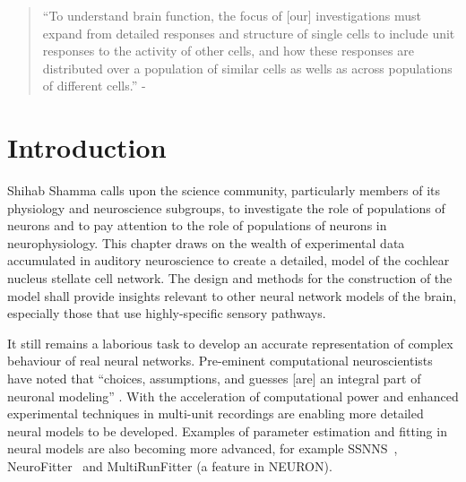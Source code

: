
\begin{quotation}
  ``To understand brain function, the focus of [our] investigations must expand from detailed responses and structure of single cells to include unit responses to the activity of other cells, and how these responses are distributed over a population of similar cells as wells as across populations  of different cells.''
- \textit{\citet[p.]{Shamma:1998}}
\end{quotation}


\section{Introduction    \label{sec:CN:introduction}}

Shihab Shamma calls upon the science community, particularly members of its physiology and neuroscience subgroups, to investigate the role of populations of neurons and to pay attention to the role of populations of neurons in neurophysiology.
This chapter draws on the wealth of experimental data accumulated in auditory neuroscience to create a detailed, \BNN model of the cochlear nucleus stellate cell network.
The design and methods for the construction of the model shall provide insights relevant to other neural network models of the brain, especially those that use highly-specific sensory pathways.

It still remains a laborious task to develop an accurate representation of complex behaviour of real neural networks.
Pre-eminent computational neuroscientists have noted that ``choices, assumptions, and guesses [are] an integral part of neuronal modeling'' \citep{SegevBurkeEtAl:1998}.
With the acceleration of computational power and enhanced experimental techniques in multi-unit recordings are enabling more detailed neural models to be developed.
Examples of parameter estimation and fitting in neural models are also becoming more advanced, for example SSNNS~\citep{SichtigSchafferEtAl:2008}, NeuroFitter \citep{VanAchardEtAl:2007}~and MultiRunFitter (a feature in NEURON).



